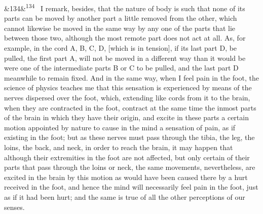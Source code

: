 \documentclass[12pt]{article}
\newcommand{\para}[1][]{\par\noindent\ifx&#1&\else\textsuperscript{\footnotesize #1}~\fi}
\begin{document}
\para[134] I remark, besides, that the nature of body is such that none of its parts can be moved by another part a little removed from the other, which cannot likewise be moved in the same way by any one of the parts that lie between those two, although the most remote part does not act at all. As, for example, in the cord A, B, C, D, [which is in tension], if its last part D, be pulled, the first part A, will not be moved in a different way than it would be were one of the intermediate parts B or C to be pulled, and the last part D meanwhile to remain fixed. And in the same way, when I feel pain in the foot, the science of physics teaches me that this sensation is experienced by means of the nerves dispersed over the foot, which, extending like cords from it to the brain, when they are contracted in the foot, contract at the same time the inmost parts of the brain in which they have their origin, and excite in these parts a certain motion appointed by nature to cause in the mind a sensation of pain, as if existing in the foot; but as these nerves must pass through the tibia, the leg, the loins, the back, and neck, in order to reach the brain, it may happen that although their extremities in the foot are not affected, but only certain of their parts that pass through the loins or neck, the same movements, nevertheless, are excited in the brain by this motion as would have been caused there by a hurt received in the foot, and hence the mind will necessarily feel pain in the foot, just as if it had been hurt; and the same is true of all the other perceptions of our senses.
\end{document}
